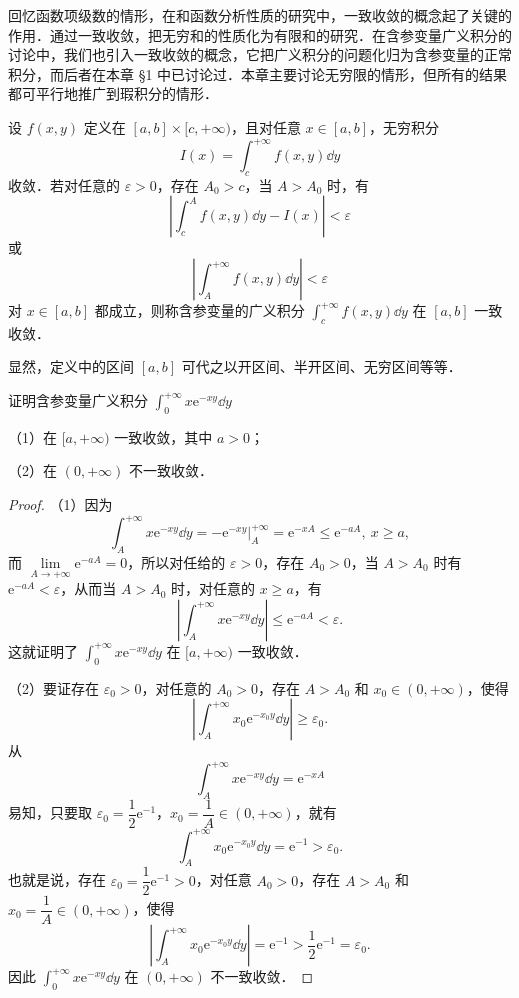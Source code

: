 回忆函数项级数的情形，在和函数分析性质的研究中，一致收敛的概念起了关键的作用．通过一致收敛，把无穷和的性质化为有限和的研究．在含参变量广义积分的讨论中，我们也引入一致收敛的概念，它把广义积分的问题化归为含参变量的正常积分，而后者在本章 §1 中已讨论过．本章主要讨论无穷限的情形，但所有的结果都可平行地推广到瑕积分的情形．

\begin{definition}\label{def:19-1}
设 $f(x,y)$ 定义在 $[a,b]\times[c,+\infty)$，且对任意 $x\in[a,b]$，无穷积分
\[
I(x)=\int_{c}^{+\infty}f(x,y)\dd y
\]
收敛．若对任意的 $\varepsilon>0$，存在 $A_{0}>c$，当 $A>A_{0}$ 时，有
\[
\left|\int_{c}^{A}f(x,y)\dd y-I(x)\right|<\varepsilon
\]
或
\[
\left|\int_{A}^{+\infty}f(x,y)\dd y\right|<\varepsilon
\]
对 $x\in[a,b]$ 都成立，则称含参变量的广义积分 $\displaystyle\int_{c}^{+\infty}f(x,y)\dd y$ 在 $[a,b]$ 一致收敛．
\end{definition}

显然，定义中的区间 $[a,b]$ 可代之以开区间、半开区间、无穷区间等等．

\begin{example}\label{ex:19-2-1}
证明含参变量广义积分 $\displaystyle\int_{0}^{+\infty}x\mathrm{e}^{-xy}\dd y$

（1）在 $[a,+\infty)$ 一致收敛，其中 $a>0$；

（2）在 $(0,+\infty)$ 不一致收敛．
\end{example}

\begin{proof}
（1）因为
\[
\int_{A}^{+\infty}x\mathrm{e}^{-xy}\dd y=-\left.\mathrm{e}^{-xy}\right|_{A}^{+\infty}=\mathrm{e}^{-xA}\leqslant\mathrm{e}^{-aA},\ x\geqslant a,
\]
而 $\lim\limits_{A\to+\infty}\mathrm{e}^{-aA}=0$，所以对任给的 $\varepsilon>0$，存在 $A_{0}>0$，当 $A>A_{0}$ 时有 $\mathrm{e}^{-aA}<\varepsilon$，从而当 $A>A_{0}$ 时，对任意的 $x\geqslant a$，有
\[
\left|\int_{A}^{+\infty}x\mathrm{e}^{-xy}\dd y\right|\leqslant\mathrm{e}^{-aA}<\varepsilon.
\]
这就证明了 $\displaystyle\int_{0}^{+\infty}x\mathrm{e}^{-xy}\dd y$ 在 $[a,+\infty)$ 一致收敛．

（2）要证存在 $\varepsilon_{0}>0$，对任意的 $A_{0}>0$，存在 $A>A_{0}$ 和 $x_{0}\in(0,+\infty)$，使得
\[
\left|\int_{A}^{+\infty}x_{0}\mathrm{e}^{-x_{0}y}\dd y\right|\geqslant\varepsilon_{0}.
\]
从
\[
\int_{A}^{+\infty}x\mathrm{e}^{-xy}\dd y=\mathrm{e}^{-xA}
\]
易知，只要取 $\varepsilon_{0}=\dfrac{1}{2}\mathrm{e}^{-1}$，$x_{0}=\dfrac{1}{A}\in(0,+\infty)$，就有
\[
\int_{A}^{+\infty}x_{0}\mathrm{e}^{-x_{0}y}\dd y=\mathrm{e}^{-1}>\varepsilon_{0}.
\]
也就是说，存在 $\varepsilon_{0}=\dfrac{1}{2}\mathrm{e}^{-1}>0$，对任意 $A_{0}>0$，存在 $A>A_{0}$ 和 $x_{0}=\dfrac{1}{A}\in(0,+\infty)$，使得
\[
\left|\int_{A}^{+\infty}x_{0}\mathrm{e}^{-x_{0}y}\dd y\right|=\mathrm{e}^{-1}>\frac{1}{2}\mathrm{e}^{-1}=\varepsilon_{0}.
\]
因此 $\displaystyle\int_{0}^{+\infty}x\mathrm{e}^{-xy}\dd y$ 在 $(0,+\infty)$ 不一致收敛．
\end{proof}


